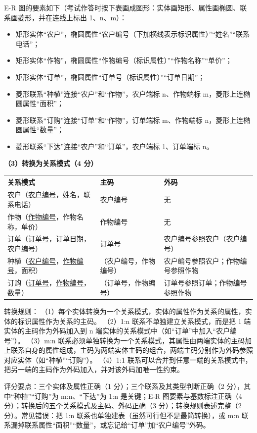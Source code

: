 \documentclass[a4paper,11pt]{article}
\begin{document}
E-R 图的要素如下（考试作答时按下表画成图形：实体画矩形、属性画椭圆、联系画菱形，并在连线上标出 1、n、m）：
\begin{itemize}[leftmargin=1.6em, itemsep=1pt]
  \item 矩形实体“农户”，椭圆属性“农户编号（下加横线表示标识属性）”“姓名”“联系电话”；
  \item 矩形实体“作物”，椭圆属性“作物编号（标识属性）”“作物名称”“单价”；
  \item 矩形实体“订单”，椭圆属性“订单号（标识属性）”“订单日期”；
  \item 菱形联系“种植”连接“农户”和“作物”，农户端标 n、作物端标 m，菱形上连椭圆属性“面积”；
  \item 菱形联系“订购”连接“订单”和“作物”，订单端标 m、作物端标 n，菱形上连椭圆属性“数量”；
  \item 菱形联系“下达”连接“农户”和“订单”，农户端标 1、订单端标 n。
\end{itemize}

\textbf{（3）转换为关系模式（4 分）}
\begin{center}
\small
\begin{tabular}{@{}p{5.6cm}p{2.9cm}p{7.3cm}@{}}
\toprule
关系模式 & 主码 & 外码 \\
\midrule
农户（\underline{农户编号}，姓名，联系电话） & 农户编号 & 无 \\
作物（\underline{作物编号}，作物名称，单价） & 作物编号 & 无 \\
订单（\underline{订单号}，订单日期，农户编号） & 订单号 & 农户编号参照农户（农户编号） \\
种植（\underline{农户编号}，\underline{作物编号}，面积） & （农户编号，作物编号） & 农户编号参照农户；作物编号参照作物 \\
订购（\underline{订单号}，\underline{作物编号}，数量） & （订单号，作物编号） & 订单号参照订单；作物编号参照作物 \\
\bottomrule
\end{tabular}
\end{center}

转换规则：
（1）每个实体转换为一个关系模式，实体的属性作为关系的属性，实体的标识属性作为关系的主码。
（2）1:n 联系不单独建立关系模式，而是把 1 端实体的主码作为外码加入到 n 端实体的关系模式中（如“订单”中加入“农户编号”）。
（3）m:n 联系必须单独转换为一个关系模式，其属性由两端实体的主码加上联系自身的属性组成，主码为两端实体主码的组合，两端主码分别作为外码参照对应实体（如“种植”“订购”）。
（4）1:1 联系可以合并到任意一端的关系模式中，把另一端的主码作为外码加入，并对该外码加唯一性约束。
\begin{analysis}评分要点：三个实体及属性正确（1 分）；三个联系及其类型判断正确（2 分），其中“种植”“订购”为 m:n、“下达”为 1:n 是关键；E-R 图要素与基数标注正确（4 分）；转换后的五个关系模式及主码、外码正确（3 分）；转换规则表述完整（2 分）。常见错误：把 1:n 联系也单独建表（虽然可行但不是最简转换），或 m:n 联系漏掉联系属性“面积”“数量”，或忘记给“订单”加“农户编号”外码。\end{analysis}
\end{document}

